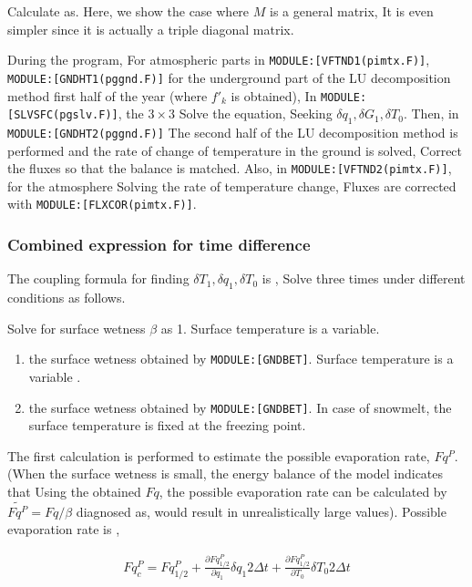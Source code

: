 Calculate as. Here, we show the case where \(M\) is a general matrix, It
is even simpler since it is actually a triple diagonal matrix.

During the program, For atmospheric parts in
\texttt{MODULE:{[}VFTND1(pimtx.F){]}},
\texttt{MODULE:{[}GNDHT1(pggnd.F){]}} for the underground part of the LU
decomposition method first half of the year (where \(f'_k\) is
obtained), In \texttt{MODULE:{[}SLVSFC(pgslv.F){]}}, the \(3\times 3\)
Solve the equation, Seeking \(\delta q_1, \delta G_1, \delta T_0\).
Then, in \texttt{MODULE:{[}GNDHT2(pggnd.F){]}} The second half of the LU
decomposition method is performed and the rate of change of temperature
in the ground is solved, Correct the fluxes so that the balance is
matched. Also, in \texttt{MODULE:{[}VFTND2(pimtx.F){]}}, for the
atmosphere Solving the rate of temperature change, Fluxes are corrected
with \texttt{MODULE:{[}FLXCOR(pimtx.F){]}}.

\hypertarget{combined-expression-for-time-difference}{%
\subsubsection{Combined expression for time
difference}\label{combined-expression-for-time-difference}}

The coupling formula for finding \(\delta T_1, \delta q_1, \delta T_0\)
is , Solve three times under different conditions as follows.

Solve for surface wetness \(\beta\) as 1. Surface temperature is a
variable.

\begin{enumerate}
\def\labelenumi{\arabic{enumi}.}
\setcounter{enumi}{1}
\item
  the surface wetness obtained by \texttt{MODULE:{[}GNDBET{]}}. Surface
  temperature is a variable .
\item
  the surface wetness obtained by \texttt{MODULE:{[}GNDBET{]}}. In case
  of snowmelt, the surface temperature is fixed at the freezing point.
\end{enumerate}

The first calculation is performed to estimate the possible evaporation
rate, \(Fq^P\). (When the surface wetness is small, the energy balance
of the model indicates that Using the obtained \(Fq\), the possible
evaporation rate can be calculated by \(\widetilde{Fq^P} = Fq / \beta\)
diagnosed as, would result in unrealistically large values). Possible
evaporation rate is ,

\begin{eqnarray}
  Fq^P_c = Fq^P_{1/2}
       + \frac{\partial Fq^P_{1/2}}{\partial q_1} \delta q_1 2 \Delta t
       + \frac{\partial Fq^P_{1/2}}{\partial T_0} \delta T_0 2 \Delta t
\end{eqnarray}

